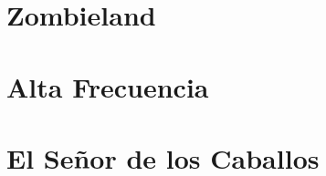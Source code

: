 \documentclass[a4paper, 11pt]{report}
\begin{document}
\pagestyle{myheadings}
\maketitle


\thispagestyle{empty}
\tableofcontents

 \newpage
 \chapter{Zombieland}
 

 \newpage
 \chapter{Alta Frecuencia}
 

\newpage
\chapter{El Señor de los Caballos}

\end{document}
